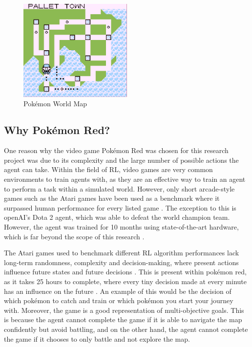 \begin{figure}[H]
    \centering
    \includegraphics[width=0.5\textwidth]{figures/red_map.png}
    \caption{Pokémon World Map}
    \label{fig:pkmn_map}
\end{figure}

\subsection{Why Pokémon Red?}

One reason why the video game Pokémon Red was chosen for this research project was due to its complexity and the large number of possible actions the agent can take. Within the field of RL, video games are very common environments to train agents with, as they are an effective way to train an agent to perform a task within a simulated world. However, only short arcade-style games such as the Atari games have been used as a benchmark where it surpassed human performance for every listed game \cite{brockman2016openai}. The exception to this is openAI's Dota 2 agent, which was able to defeat the world champion team. However, the agent was trained for 10 months using state-of-the-art hardware, which is far beyond the scope of this research \cite{berner2019dota}.

The Atari games used to benchmark different RL algorithm performances lack long-term randomness, complexity and decision-making, where present actions influence future states and future decisions \cite{brockman2016openai}. This is present within pokémon red, as it takes 25 hours to complete, where every tiny decision made at every minute has an influence on the future \cite{howlongtobeat}. An example of this would be the decision of which pokémon to catch and train or which pokémon you start your journey with. Moreover, the game is a good representation of multi-objective goals. This is because the agent cannot complete the game if it is able to navigate the map confidently but avoid battling, and on the other hand, the agent cannot complete the game if it chooses to only battle and not explore the map.

